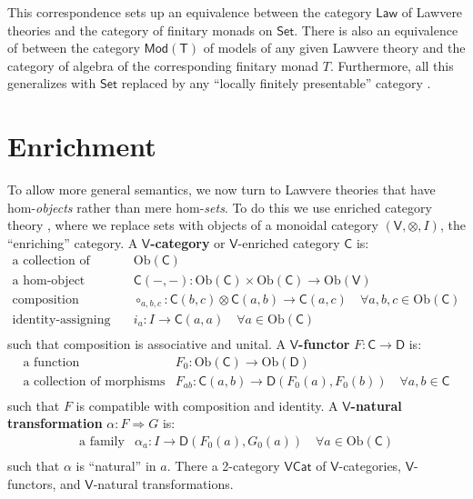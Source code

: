 \documentclass{amsart}
\theoremstyle{definition}
\newcommand{\Set}{\mathsf{Set}}
\newcommand{\Cat}{\mathsf{Cat}}
\newcommand{\Law}{\mathsf{Law}}
\newcommand{\Mod}{\mathsf{Mod}}
\newcommand{\V}{\mathsf{V}}
\newcommand{\D}{\mathsf{D}}
\newcommand{\C}{\mathsf{C}}
\newcommand{\T}{\mathsf{T}}
\newcommand{\Obj}{\mathrm{Ob}}
\newcommand{\maps}{\colon}
\begin{document}
This correspondence sets up an equivalence between the category $\Law$ of Lawvere theories and the category of finitary monads on $\Set$.  There is also an equivalence of between the category $\Mod(\T)$ of models of any given Lawvere theory and the category of algebra of the corresponding finitary monad $T$.  Furthermore, all this generalizes with $\Set$ replaced by any ``locally finitely presentable'' category \cite{adamekrosicky}.   

\section{Enrichment}

To allow more general semantics, we now turn to Lawvere theories that have hom-\emph{objects} rather than mere hom-\emph{sets}.  To do this we use enriched category theory \cite{kelly}, where we replace sets with objects of a monoidal category  $(\V,\otimes,I)$, the ``enriching'' category.   A \textbf{$\V$-category} or $\V$-enriched category $\C$ is:
\[\begin{array}{rl}
\text{a collection of objects} & \Obj(\C)\\
\text{a hom-object function} & \C(-,-)\maps \Obj(\C) \times \Obj(\C) \to \Obj(\V)\\
\text{composition morphisms} & \circ_{a,b,c}\maps\C(b,c) \otimes \C(a,b) \to \C(a,c) \quad \forall a,b,c \in \Obj(\C)\\
\text{identity-assigning morphisms} & i_a\maps I\to\C(a,a) \quad \forall a \in \Obj(\C)\\
\end{array}\]
such that composition is associative and unital.  A \textbf{$\V$-functor} $F\maps\C \to \D$ is:
\[\begin{array}{rl}
\text{a function} & F_0\maps \Obj(\C) \to \Obj(\D)\\
\text{a collection of morphisms} & F_{ab}\maps \C(a,b) \to \D(F_0(a),F_0(b)) \quad \forall a,b \in \C\\
\end{array}\]
such that $F$ is compatible with composition and identity.  A \textbf{$\V$-natural transformation} $\alpha\maps F \Rightarrow G$ is:
\[\begin{array}{rl}
\text{a family} & \alpha_a\maps I \to \D(F_0(a),G_0(a)) \quad \forall a \in \Obj(\C)\\
\end{array}\]
such that $\alpha$ is ``natural'' in $a$.   There a 2-category \textbf{$\V\Cat$} of $\V$-categories, $\V$-functors, and $\V$-natural transformations. 
\end{document}
